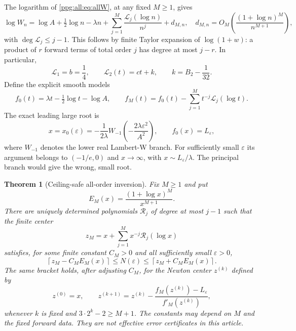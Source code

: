 \documentclass[11pt,letterpaper]{article}
\newtheorem{theorem}{Theorem}[section]
\theoremstyle{remark}\newtheorem{remark}[theorem]{Remark}
\numberwithin{equation}{section}
\begin{document}
The logarithm of \eqref{ppg:all:eq:allW}, at any fixed $M\ge1$, gives
\begin{equation}\label{ppg:all:eq:logW}
 \log W_n=\log A+\tfrac12\log n-\lambda n
       +\sum_{j=1}^M\frac{\mathcal L_j(\log n)}{n^j}+d_{M,n},
 \quad d_{M,n}=O_M\!\left(\frac{(1+\log n)^M}{n^{M+1}}\right),
\end{equation}
with $\deg\mathcal L_j\le j-1$. This follows by finite Taylor expansion of $\log(1+w)$: a product of $r$ forward terms of total order $j$ has degree at most $j-r$. In particular,
\begin{equation}\label{ppg:all:eq:logfirst}
 \mathcal L_1=b=\frac14,\qquad
 \mathcal L_2(t)=ct+k,\qquad k=B_2-\frac1{32}.
\end{equation}
Define the explicit smooth models
\begin{equation}\label{ppg:all:eq:fM}
 f_0(t)=\lambda t-\tfrac12\log t-\log A,
 \qquad f_M(t)=f_0(t)-\sum_{j=1}^M t^{-j}\mathcal L_j(\log t).
\end{equation}
The exact leading large root is
\begin{equation}\label{ppg:all:eq:x0}
 x=x_0(\varepsilon)
 =-\frac1{2\lambda}W_{-1}\!\left(-\frac{2\lambda\varepsilon^2}{A^2}\right),
 \qquad f_0(x)=L_\varepsilon,
\end{equation}
where $W_{-1}$ denotes the lower real Lambert-W branch. For sufficiently small $\varepsilon$ its argument belongs to $(-1/e,0)$ and $x\to\infty$, with $x\sim L_\varepsilon/\lambda$. The principal branch would give the wrong, small root.

\begin{theorem}[Ceiling-safe all-order inversion]\label{ppg:all:thm:threshold}
Fix $M\ge1$ and put
\[
 E_M(x)=\frac{(1+\log x)^M}{x^{M+1}}.
\]
There are uniquely determined polynomials $\mathcal R_j$ of degree at most $j-1$ such that the finite center
\begin{equation}\label{ppg:all:eq:formalcenter}
 z_M=x+\sum_{j=1}^M x^{-j}\mathcal R_j(\log x)
\end{equation}
satisfies, for some finite constant $C_M>0$ and all sufficiently small $\varepsilon>0$,
\begin{equation}\label{ppg:all:eq:ceiling}
 \left\lceil z_M-C_ME_M(x)\right\rceil
 \le N(\varepsilon)\le
 \left\lceil z_M+C_ME_M(x)\right\rceil.
\end{equation}
The same bracket holds, after adjusting $C_M$, for the Newton center $z^{(k)}$ defined by
\begin{equation}\label{ppg:all:eq:newton}
 z^{(0)}=x,\qquad
 z^{(k+1)}=z^{(k)}-
     \frac{f_M(z^{(k)})-L_\varepsilon}{f'_M(z^{(k)})},
\end{equation}
whenever $k$ is fixed and $3\cdot2^k-2\ge M+1$.
The constants may depend on $M$ and the fixed forward data. They are not effective error certificates in this article.
\end{theorem}
\end{document}

